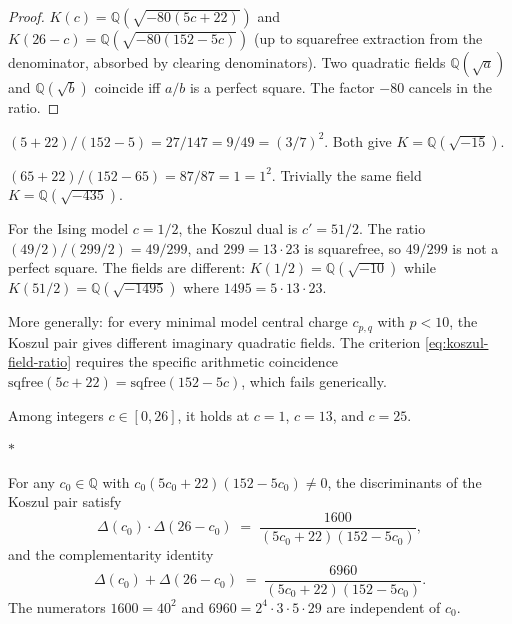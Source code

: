 \documentclass[11pt]{article}
\newcommand{\Q}{\mathbb{Q}}
\newcommand{\sep}{\bigskip\begin{center}$*$\end{center}\medskip}
\begin{document}
\begin{proof}
$K(c) = \Q(\sqrt{-80(5c{+}22)})$ and
$K(26{-}c) = \Q(\sqrt{-80(152{-}5c)})$
(up to squarefree extraction from the denominator, absorbed
by clearing denominators).  Two quadratic fields
$\Q(\sqrt{a})$ and $\Q(\sqrt{b})$ coincide iff $a/b$ is a
perfect square.  The factor $-80$ cancels in the ratio.
\end{proof}

\begin{example}[The pair $c = 1$, $c = 25$]
$(5 + 22)/(152 - 5) = 27/147 = 9/49 = (3/7)^2$.
Both give $K = \Q(\sqrt{-15})$.
\end{example}

\begin{example}[The self-dual point $c = 13$]
$(65 + 22)/(152 - 65) = 87/87 = 1 = 1^2$.
Trivially the same field $K = \Q(\sqrt{-435})$.
\end{example}

\begin{remark}
\label{rem:koszul-field-failure}
For the Ising model $c = 1/2$, the Koszul dual is
$c' = 51/2$.  The ratio $(49/2)/(299/2) = 49/299$,
and $299 = 13 \cdot 23$ is squarefree, so $49/299$
is not a perfect square.  The fields are different:
$K(1/2) = \Q(\sqrt{-10})$ while
$K(51/2) = \Q(\sqrt{-1495})$ where
$1495 = 5 \cdot 13 \cdot 23$.

More generally: for every minimal model central charge
$c_{p,q}$ with $p < 10$, the Koszul pair gives
different imaginary quadratic fields.  The criterion
\eqref{eq:koszul-field-ratio} requires the specific
arithmetic coincidence $\mathrm{sqfree}(5c+22) =
\mathrm{sqfree}(152-5c)$, which fails generically.

Among integers $c \in [0, 26]$, it holds at
$c = 1$, $c = 13$, and $c = 25$.
\end{remark}

\sep

\begin{proposition}
\label{prop:field-complementarity}
For any $c_0 \in \Q$ with $c_0(5c_0{+}22)(152{-}5c_0) \neq 0$,
the discriminants of the Koszul pair satisfy
\begin{equation}\label{eq:delta-product}
  \Delta(c_0) \cdot \Delta(26 - c_0)
  \;=\;
  \frac{1600}{(5c_0 + 22)(152 - 5c_0)},
\end{equation}
and the complementarity identity
\begin{equation}\label{eq:delta-sum-specialised}
  \Delta(c_0) + \Delta(26 - c_0)
  \;=\;
  \frac{6960}{(5c_0 + 22)(152 - 5c_0)}.
\end{equation}
The numerators $1600 = 40^2$ and $6960 = 2^4 \cdot 3 \cdot 5
\cdot 29$ are independent of $c_0$.
\end{proposition}
\end{document}
